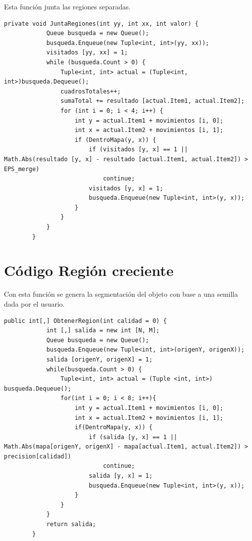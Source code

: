 \documentclass[12pt]{report}
\begin{document}
\newpage
\vspace*{3cm}
Esta función junta las regiones separadas.
\lstset{language=C, breaklines=true, basicstyle=\footnotesize}
\lstset{numbers=left, numberstyle=\tiny, stepnumber=1, numbersep=-2pt}
\begin{lstlisting}[frame=single]
	private void JuntaRegiones(int yy, int xx, int valor) {
            Queue busqueda = new Queue();
            busqueda.Enqueue(new Tuple<int, int>(yy, xx));
            visitados [yy, xx] = 1;
            while (busqueda.Count > 0) {
                Tuple<int, int> actual = (Tuple<int, int>)busqueda.Dequeue();
                cuadrosTotales++;
                sumaTotal += resultado [actual.Item1, actual.Item2];
                for (int i = 0; i < 4; i++) {
                    int y = actual.Item1 + movimientos [i, 0];
                    int x = actual.Item2 + movimientos [i, 1];
                    if (DentroMapa(y, x)) {
                        if (visitados [y, x] == 1 || Math.Abs(resultado [y, x] - resultado [actual.Item1, actual.Item2]) > EPS_merge)
                            continue;
                        visitados [y, x] = 1;
                        busqueda.Enqueue(new Tuple<int, int>(y, x));
                    }
                }
            }
        }
\end{lstlisting}

\chapter{Código Región creciente}
Con esta función se genera la segmentación del objeto con base a una semilla dada por el usuario.
\lstset{language=C, breaklines=true, basicstyle=\footnotesize}
\lstset{numbers=left, numberstyle=\tiny, stepnumber=1, numbersep=-2pt}
\begin{lstlisting}[frame=single]
	public int[,] ObtenerRegion(int calidad = 0) {
            int [,] salida = new int [N, M];
            Queue busqueda = new Queue();
            busqueda.Enqueue(new Tuple<int, int>(origenY, origenX));
            salida [origenY, origenX] = 1;
            while(busqueda.Count > 0) {
                Tuple<int, int> actual = (Tuple <int, int>) busqueda.Dequeue();
                for(int i = 0; i < 8; i++){
                    int y = actual.Item1 + movimientos [i, 0];
                    int x = actual.Item2 + movimientos [i, 1];
                    if(DentroMapa(y, x)) {
                        if (salida [y, x] == 1 || Math.Abs(mapa[origenY, origenX] - mapa[actual.Item1, actual.Item2]) > precision[calidad])
                            continue;
                        salida [y, x] = 1;
                        busqueda.Enqueue(new Tuple<int, int>(y, x));
                    }
                }
            }
            return salida;
        }
	
\end{lstlisting}
\end{document}
